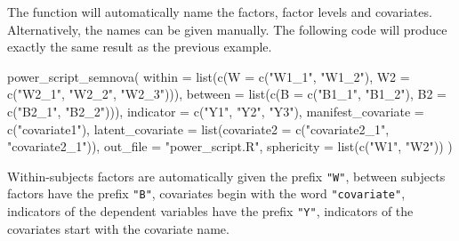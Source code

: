 \documentclass[
]{book}
\newenvironment{Shaded}{\begin{snugshade}}{\end{snugshade}}
\newcommand{\AttributeTok}[1]{\textcolor[rgb]{0.77,0.63,0.00}{#1}}
\newcommand{\FunctionTok}[1]{\textcolor[rgb]{0.00,0.00,0.00}{#1}}
\newcommand{\NormalTok}[1]{#1}
\newcommand{\StringTok}[1]{\textcolor[rgb]{0.31,0.60,0.02}{#1}}
\begin{document}
The function will automatically name the factors, factor levels and covariates. Alternatively, the names can be given manually. The following code will produce exactly the same result as the previous example.

\begin{Shaded}
\begin{Highlighting}[]
\FunctionTok{power\_script\_semnova}\NormalTok{(}
    \AttributeTok{within =} \FunctionTok{list}\NormalTok{(}\FunctionTok{c}\NormalTok{(}\AttributeTok{W =} \FunctionTok{c}\NormalTok{(}\StringTok{"W1\_1"}\NormalTok{, }\StringTok{"W1\_2"}\NormalTok{), }\AttributeTok{W2 =} \FunctionTok{c}\NormalTok{(}\StringTok{"W2\_1"}\NormalTok{, }\StringTok{"W2\_2"}\NormalTok{, }\StringTok{"W2\_3"}\NormalTok{))),}
    \AttributeTok{between =} \FunctionTok{list}\NormalTok{(}\FunctionTok{c}\NormalTok{(}\AttributeTok{B =} \FunctionTok{c}\NormalTok{(}\StringTok{"B1\_1"}\NormalTok{, }\StringTok{"B1\_2"}\NormalTok{), }\AttributeTok{B2 =} \FunctionTok{c}\NormalTok{(}\StringTok{"B2\_1"}\NormalTok{, }\StringTok{"B2\_2"}\NormalTok{))),}
    \AttributeTok{indicator =} \FunctionTok{c}\NormalTok{(}\StringTok{"Y1"}\NormalTok{, }\StringTok{"Y2"}\NormalTok{, }\StringTok{"Y3"}\NormalTok{),}
    \AttributeTok{manifest\_covariate =} \FunctionTok{c}\NormalTok{(}\StringTok{"covariate1"}\NormalTok{),}
    \AttributeTok{latent\_covariate =} \FunctionTok{list}\NormalTok{(}\AttributeTok{covariate2 =} \FunctionTok{c}\NormalTok{(}\StringTok{"covariate2\_1"}\NormalTok{, }\StringTok{"covariate2\_1"}\NormalTok{)),}
    \AttributeTok{out\_file =} \StringTok{"power\_script.R"}\NormalTok{,}
    \AttributeTok{sphericity =} \FunctionTok{list}\NormalTok{(}\FunctionTok{c}\NormalTok{(}\StringTok{"W1"}\NormalTok{, }\StringTok{"W2"}\NormalTok{))}
\NormalTok{)}
\end{Highlighting}
\end{Shaded}

Within-subjects factors are automatically given the prefix \texttt{"W"}, between subjects factors have the prefix \texttt{"B"}, covariates begin with the word \texttt{"covariate"}, indicators of the dependent variables have the prefix \texttt{"Y"}, indicators of the covariates start with the covariate name.
\end{document}
